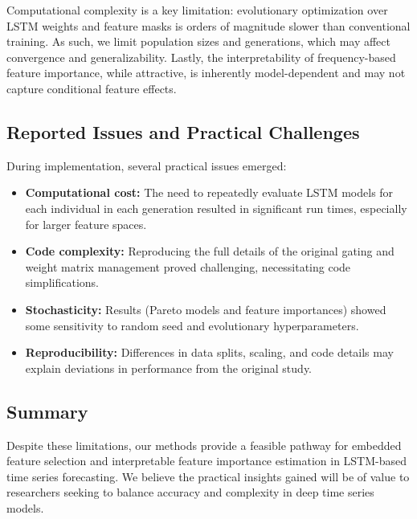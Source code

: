 \documentclass[12pt]{article}
\begin{document}
Computational complexity is a key limitation: evolutionary optimization over LSTM weights and feature masks is orders of magnitude slower than conventional training. As such, we limit population sizes and generations, which may affect convergence and generalizability. Lastly, the interpretability of frequency-based feature importance, while attractive, is inherently model-dependent and may not capture conditional feature effects.

\subsection{Reported Issues and Practical Challenges}

During implementation, several practical issues emerged:
\begin{itemize}
    \item \textbf{Computational cost:} The need to repeatedly evaluate LSTM models for each individual in each generation resulted in significant run times, especially for larger feature spaces.
    \item \textbf{Code complexity:} Reproducing the full details of the original gating and weight matrix management proved challenging, necessitating code simplifications.
    \item \textbf{Stochasticity:} Results (Pareto models and feature importances) showed some sensitivity to random seed and evolutionary hyperparameters.
    \item \textbf{Reproducibility:} Differences in data splits, scaling, and code details may explain deviations in performance from the original study.
\end{itemize}

\subsection{Summary}

Despite these limitations, our methods provide a feasible pathway for embedded feature selection and interpretable feature importance estimation in LSTM-based time series forecasting. We believe the practical insights gained will be of value to researchers seeking to balance accuracy and complexity in deep time series models.
\end{document}
